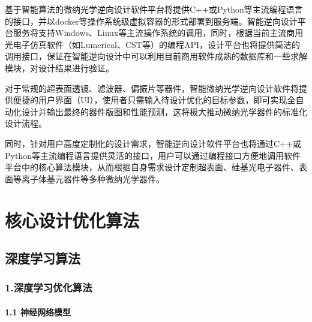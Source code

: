 \documentclass[a4paper,10pt,english]{sphinxmanual}
\begin{document}
\sphinxAtStartPar
基于智能算法的微纳光学逆向设计软件平台将提供C++或Python等主流编程语言的接口，并以docker等操作系统级虚拟容器的形式部署到服务端。智能逆向设计平台服务将支持Windows、Linux等主流操作系统的调用，同时，根据当前主流商用光电子仿真软件（如Lumerical、CST等）的编程API，设计平台也将提供简洁的调用接口，保证在智能逆向设计中可以利用目前商用软件成熟的数据库和一些求解模块，对设计结果进行验证。

\sphinxAtStartPar
对于常规的超表面透镜、滤波器、偏振片等器件，智能微纳光学逆向设计软件将提供便捷的用户界面（UI），使用者只需输入待设计优化的目标参数，即可实现全自动化设计并输出最终的器件版图和性能预测，这将极大推动微纳光学器件的标准化设计流程。

\sphinxAtStartPar
同时，针对用户高度定制化的设计需求，智能逆向设计软件平台也将通过C++或Python等主流编程语言提供灵活的接口，用户可以通过编程接口方便地调用软件平台中的核心算法模块，从而根据自身需求设计定制超表面、硅基光电子器件、表面等离子体基元器件等多种微纳光学器件。

\sphinxstepscope


\section{核心设计优化算法}
\label{\detokenize{_u7b80_u4ecb/_u6838_u5fc3_u8bbe_u8ba1_u4f18_u5316_u7b97_u6cd5/index:id1}}\label{\detokenize{_u7b80_u4ecb/_u6838_u5fc3_u8bbe_u8ba1_u4f18_u5316_u7b97_u6cd5/index::doc}}
\sphinxstepscope


\subsection{深度学习算法}
\label{\detokenize{_u7b80_u4ecb/_u6838_u5fc3_u8bbe_u8ba1_u4f18_u5316_u7b97_u6cd5/_u6df1_u5ea6_u5b66_u4e60_u6a21_u5757/_u6df1_u5ea6_u5b66_u4e60_u6a21_u578b:id1}}\label{\detokenize{_u7b80_u4ecb/_u6838_u5fc3_u8bbe_u8ba1_u4f18_u5316_u7b97_u6cd5/_u6df1_u5ea6_u5b66_u4e60_u6a21_u5757/_u6df1_u5ea6_u5b66_u4e60_u6a21_u578b::doc}}

\subsubsection{1.深度学习优化算法}
\label{\detokenize{_u7b80_u4ecb/_u6838_u5fc3_u8bbe_u8ba1_u4f18_u5316_u7b97_u6cd5/_u6df1_u5ea6_u5b66_u4e60_u6a21_u5757/_u6df1_u5ea6_u5b66_u4e60_u6a21_u578b:id2}}

\paragraph{1.1 神经网络模型}
\label{\detokenize{_u7b80_u4ecb/_u6838_u5fc3_u8bbe_u8ba1_u4f18_u5316_u7b97_u6cd5/_u6df1_u5ea6_u5b66_u4e60_u6a21_u5757/_u6df1_u5ea6_u5b66_u4e60_u6a21_u578b:id3}}
\end{document}
